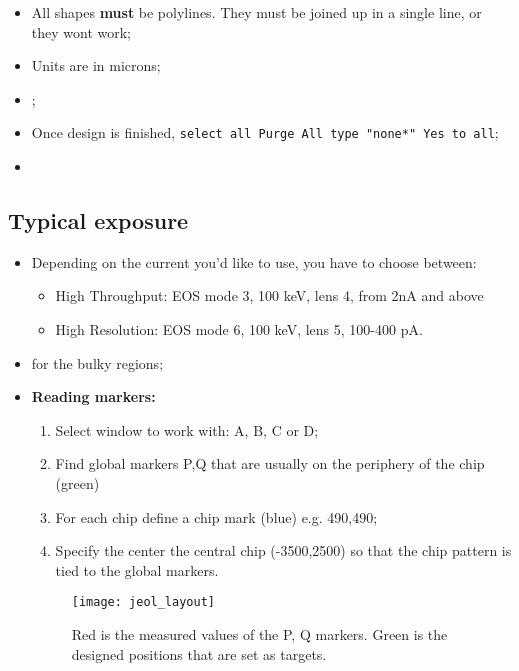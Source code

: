 \begin{itemize}
\item All shapes \textbf{must} be polylines.  They must be joined up in
  a single line, or they wont work;
\item Units are in microns;
\item {};
\item Once design  is finished, \texttt{select all \ira  Purge \ira All
    \ira type "none*" \ira Yes to all};

\item {}
\end{itemize}

\newpage\subsection{Typical exposure}
\label{sec:typic-expos-param}
\begin{itemize}
\item Depending  on the current you'd  like to use, you  have to choose
  between:
  \begin{itemize}
  \item High  Throughput: EOS  mode 3,  100 keV, lens  4, from  2nA and
    above
  \item High Resolution: EOS mode 6, 100 keV, lens 5, 100-400 pA.
  \end{itemize}
\item {} for the bulky regions;
\item \textbf{Reading markers:}
  \begin{enumerate}
  \item Select window to work with: A, B, C or D;
  \item Find  global markers P,Q that  are usually on the  periphery of
    the chip (green)
  \item For each chip define a chip mark (blue) e.g. 490,490;
  \item Specify  the center the  central chip (-3500,2500) so  that the
    chip pattern is tied to the global markers.
  \end{enumerate}
  \begin{figure}[h]
    \centering \texttt{[image: jeol\_layout]}
    \caption{\small Red  is the  measured values of  the P,  Q markers.
      Green   is    the   designed   positions   that    are   set   as
      targets. \label{fig:jeol_layout}}
  \end{figure}
\end{itemize}
